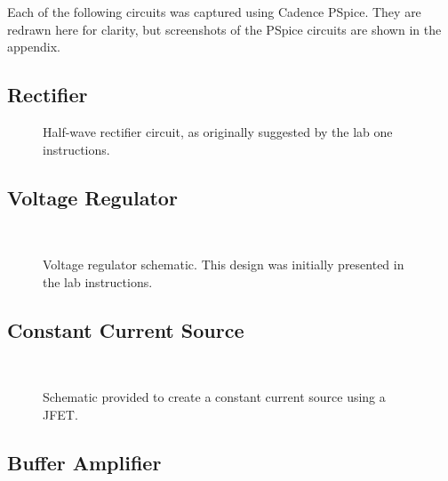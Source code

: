 Each of the following circuits was captured using Cadence PSpice.  They are
redrawn here for clarity, but screenshots of the PSpice circuits are shown in
the appendix.

\subsection{Rectifier}
\begin{figure}[H]
	\centering
	
	\parbox{3.5in}{
	\caption{Half-wave rectifier circuit, as originally suggested by the lab
	one instructions.}
	\label{fig:schem1}}
\end{figure}

\subsection{Voltage Regulator}
\begin{figure}[H]
	\centering
	\\
	\parbox{3.5in}{
	\caption{Voltage regulator schematic.  This design was initially presented
	in the lab instructions.}
	\label{fig:schem3}}
\end{figure}

\subsection{Constant Current Source}
\begin{figure}[H]
	\centering
	\\
	\parbox{3.5in}{
	\caption{Schematic provided to create a constant current source using a JFET.}
	\label{fig:schem4}}
\end{figure}

\subsection{Buffer Amplifier}
\begin{figure}[H]
	\centering
	
\end{figure}
